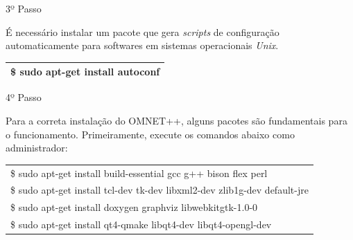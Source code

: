 \documentclass[
12pt,				%
openright,			%
oneside,			%
a4paper,			%
brazil,				%
]{abntex2}
\begin{document}
{\begin{anexosenv}
					\newpage
                	\begin{description}
		                \item[3º Passo]
		            \end{description}
		            \par É necessário instalar um pacote que gera \textit{scripts} de configuração automaticamente para softwares em sistemas operacionais \textit{Unix}.
		
		            \begin{table}[H]
			            \renewcommand{\arraystretch}{1.5}
		                \begin{tabular}{|p{15.5cm}|}
			                \hline
                            \$ sudo apt-get install autoconf \\
			                \hline
			            \end{tabular}
		            \end{table}
                    

                	\begin{description}
		                \item[4º Passo]
		            \end{description}
		            \par Para a correta instalação do OMNET++, alguns pacotes são fundamentais para o funcionamento. Primeiramente, execute os comandos abaixo como administrador:
		
		            \begin{table}[H]
			            \renewcommand{\arraystretch}{1.5}
		                \begin{tabular}{|p{15.5cm}|}
			                \hline
                            \$ sudo apt-get install build-essential gcc g++ bison flex perl \\
                            \$ sudo apt-get install tcl-dev tk-dev libxml2-dev zlib1g-dev default-jre \\
                            \$ sudo apt-get install doxygen graphviz libwebkitgtk-1.0-0 \\
                            \$ sudo apt-get install qt4-qmake libqt4-dev libqt4-opengl-dev \\
			                \hline
			            \end{tabular}
		            \end{table}
                    

\end{anexosenv}}
\end{document}
